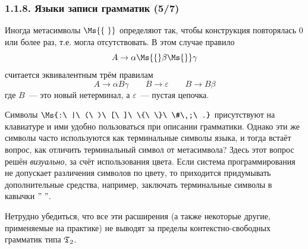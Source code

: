 \begin{frame}
\frametitle{1.1.8. Языки записи грамматик (5/7)}

\vspace{-2pt}
Иногда метасимволы $\Ms{\{\ \}}$ определяют так, чтобы конструкция
повторялась 0 или более раз, т.е. могла отсутствовать. В этом
случае правило
$$
A\rightarrow \alpha\Ms{\{}\beta\Ms{\}}\gamma
$$
считается эквивалентным трём правилам
$$
A\rightarrow \alpha B\gamma 
\qquad B\rightarrow\varepsilon 
\qquad B\rightarrow B \beta
$$
где $B$~--- это новый нетерминал, а $\varepsilon$~--- пустая
цепочка.

\begin{remark} Символы 
$\Ms{:\ |\ (\ )\ [\ ]\ \{\ \}\ \#\ ;\ .}$
присутствуют на клавиатуре и ими 
удобно пользоваться при описании 
грамматики. Однако эти же символы 
часто используются как терминальные 
символы языка, 
и тогда встаёт вопрос,
как отличить терминальный символ
от метасимвола? Здесь этот вопрос
решён {\em визуально}, 
за счёт использования цвета.
Если система программирования
не допускает различения символов по цвету,
то приходится придумывать 
дополнительные средства, например, заключать
терминальные символы в кавычки $"\ "$.
\end{remark}

Нетрудно убедиться, что все эти расширения (а также некоторые
другие, применяемые на практике) не выводят за пределы
контекстно-свободных грамматик типа $\frak{T}_2$.

\end{frame}

